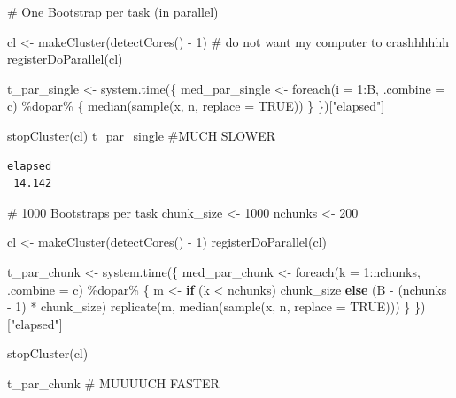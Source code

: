 \documentclass[
  letterpaper,
  DIV=11,
  numbers=noendperiod]{scrreprt}
\newenvironment{Shaded}{\begin{snugshade}}{\end{snugshade}}
\newcommand{\AttributeTok}[1]{\textcolor[rgb]{0.40,0.45,0.13}{#1}}
\newcommand{\CommentTok}[1]{\textcolor[rgb]{0.37,0.37,0.37}{#1}}
\newcommand{\ConstantTok}[1]{\textcolor[rgb]{0.56,0.35,0.01}{#1}}
\newcommand{\ControlFlowTok}[1]{\textcolor[rgb]{0.00,0.23,0.31}{\textbf{#1}}}
\newcommand{\DecValTok}[1]{\textcolor[rgb]{0.68,0.00,0.00}{#1}}
\newcommand{\FunctionTok}[1]{\textcolor[rgb]{0.28,0.35,0.67}{#1}}
\newcommand{\NormalTok}[1]{\textcolor[rgb]{0.00,0.23,0.31}{#1}}
\newcommand{\OtherTok}[1]{\textcolor[rgb]{0.00,0.23,0.31}{#1}}
\newcommand{\SpecialCharTok}[1]{\textcolor[rgb]{0.37,0.37,0.37}{#1}}
\newcommand{\StringTok}[1]{\textcolor[rgb]{0.13,0.47,0.30}{#1}}
\begin{document}
\begin{Shaded}
\begin{Highlighting}[]
\CommentTok{\# One Bootstrap per task (in parallel)}

\NormalTok{cl }\OtherTok{\textless{}{-}} \FunctionTok{makeCluster}\NormalTok{(}\FunctionTok{detectCores}\NormalTok{() }\SpecialCharTok{{-}} \DecValTok{1}\NormalTok{) }\CommentTok{\# do not want my computer to crashhhhhh}
\FunctionTok{registerDoParallel}\NormalTok{(cl)}

\NormalTok{t\_par\_single }\OtherTok{\textless{}{-}} \FunctionTok{system.time}\NormalTok{(\{}
\NormalTok{  med\_par\_single }\OtherTok{\textless{}{-}} \FunctionTok{foreach}\NormalTok{(}\AttributeTok{i =} \DecValTok{1}\SpecialCharTok{:}\NormalTok{B, }\AttributeTok{.combine =}\NormalTok{ c) }\SpecialCharTok{\%dopar\%}\NormalTok{ \{}
    \FunctionTok{median}\NormalTok{(}\FunctionTok{sample}\NormalTok{(x, n, }\AttributeTok{replace =} \ConstantTok{TRUE}\NormalTok{))}
\NormalTok{  \}}
\NormalTok{\})[}\StringTok{"elapsed"}\NormalTok{]}

\FunctionTok{stopCluster}\NormalTok{(cl)}
\NormalTok{t\_par\_single }\CommentTok{\#MUCH SLOWER}
\end{Highlighting}
\end{Shaded}

\begin{verbatim}
elapsed 
 14.142 
\end{verbatim}

\begin{Shaded}
\begin{Highlighting}[]
\CommentTok{\# 1000 Bootstraps per task}
\NormalTok{chunk\_size }\OtherTok{\textless{}{-}} \DecValTok{1000}
\NormalTok{nchunks }\OtherTok{\textless{}{-}} \DecValTok{200}

\NormalTok{cl }\OtherTok{\textless{}{-}} \FunctionTok{makeCluster}\NormalTok{(}\FunctionTok{detectCores}\NormalTok{() }\SpecialCharTok{{-}} \DecValTok{1}\NormalTok{)}
\FunctionTok{registerDoParallel}\NormalTok{(cl)}

\NormalTok{t\_par\_chunk }\OtherTok{\textless{}{-}} \FunctionTok{system.time}\NormalTok{(\{}
\NormalTok{  med\_par\_chunk }\OtherTok{\textless{}{-}} \FunctionTok{foreach}\NormalTok{(}\AttributeTok{k =} \DecValTok{1}\SpecialCharTok{:}\NormalTok{nchunks, }\AttributeTok{.combine =}\NormalTok{ c) }\SpecialCharTok{\%dopar\%}\NormalTok{ \{}
\NormalTok{    m }\OtherTok{\textless{}{-}} \ControlFlowTok{if}\NormalTok{ (k }\SpecialCharTok{\textless{}}\NormalTok{ nchunks) chunk\_size }\ControlFlowTok{else}\NormalTok{ (B }\SpecialCharTok{{-}}\NormalTok{ (nchunks }\SpecialCharTok{{-}} \DecValTok{1}\NormalTok{) }\SpecialCharTok{*}\NormalTok{ chunk\_size)}
    \FunctionTok{replicate}\NormalTok{(m, }\FunctionTok{median}\NormalTok{(}\FunctionTok{sample}\NormalTok{(x, n, }\AttributeTok{replace =} \ConstantTok{TRUE}\NormalTok{)))}
\NormalTok{  \}}
\NormalTok{\})[}\StringTok{"elapsed"}\NormalTok{]}

\FunctionTok{stopCluster}\NormalTok{(cl)}

\NormalTok{t\_par\_chunk }\CommentTok{\# MUUUUCH FASTER}
\end{Highlighting}
\end{Shaded}
\end{document}
